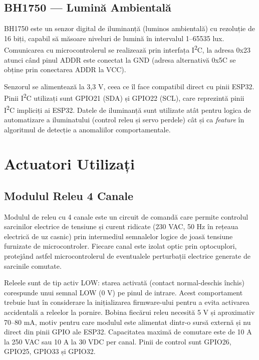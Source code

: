 \documentclass[12pt, twoside, a4paper]{report}
\begin{document}
\subsection{BH1750 --- Lumină Ambientală}

BH1750 este un senzor digital de iluminanță (luminos ambientală) cu rezoluție de
16 biți, capabil să măsoare niveluri de lumină în intervalul 1--65535 lux. Comunicarea
cu microcontrolerul se realizează prin interfața I\textsuperscript{2}C, la adresa 0x23
atunci când pinul ADDR este conectat la GND (adresa alternativă 0x5C se obține prin
conectarea ADDR la VCC).

Senzorul se alimentează la 3,3 V, ceea ce îl face compatibil direct cu pinii ESP32.
Pinii I\textsuperscript{2}C utilizați sunt GPIO21 (SDA) și GPIO22 (SCL), care reprezintă
pinii I\textsuperscript{2}C impliciți ai ESP32. Datele de iluminanță sunt utilizate atât
pentru logica de automatizare a iluminatului (control releu și servo perdele) cât și ca
\textit{feature} în algoritmul de detecție a anomaliilor comportamentale.

\section{Actuatori Utilizați}

\subsection{Modulul Releu 4 Canale}

Modulul de releu cu 4 canale este un circuit de comandă care permite controlul sarcinilor
electrice de tensiune și curent ridicate (230 VAC, 50 Hz în rețeaua electrică de uz
casnic) prin intermediul semnalelor logice de joasă tensiune furnizate de microcontroler.
Fiecare canal este izolat optic prin optocuplori, protejând astfel microcontrolerul de
eventualele perturbații electrice generate de sarcinile comutate.

Releele sunt de tip activ LOW: starea activată (contact normal-deschis închis) corespunde
unui semnal LOW (0 V) pe pinul de intrare. Acest comportament trebuie luat în considerare
la inițializarea firmware-ului pentru a evita activarea accidentală a releelor la pornire.
Bobina fiecărui releu necesită 5 V și aproximativ 70--80 mA, motiv pentru care modulul
este alimentat dintr-o sursă externă și nu direct din pinii GPIO ale ESP32. Capacitatea
maximă de comutare este de 10 A la 250 VAC sau 10 A la 30 VDC per canal. Pinii de
control sunt GPIO26, GPIO25, GPIO33 și GPIO32.
\end{document}
